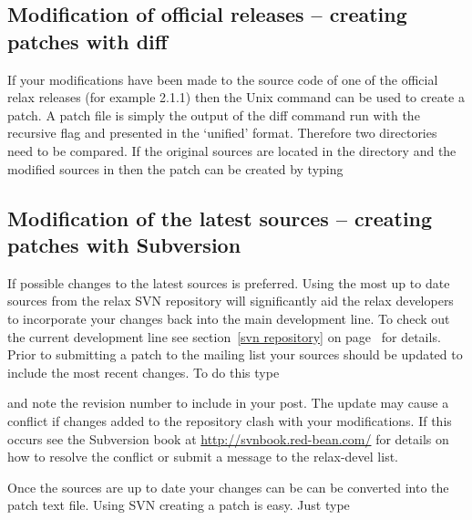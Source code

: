 \subsection{Modification of official releases -- creating patches with diff}

If your modifications have been made to the source code of one of the official relax releases (for example 2.1.1) then the Unix command  can be used to create a patch.
A patch file is simply the output of the diff command run with the recursive flag and presented in the `unified' format.
Therefore two directories need to be compared.
If the original sources are located in the directory  and the modified sources in  then the patch can be created by typing




\subsection{Modification of the latest sources -- creating patches with Subversion}

If possible changes to the latest sources is preferred.
Using the most up to date sources from the relax SVN repository will significantly aid the relax developers to incorporate your changes back into the main development line.
To check out the current development line see section~\ref{svn repository} on page~\pageref{svn repository} for details.
Prior to submitting a patch to the mailing list your sources should be updated to include the most recent changes.
To do this type


and note the revision number to include in your post.
The update may cause a conflict if changes added to the repository clash with your modifications.
If this occurs see the Subversion book at \href{http://svnbook.red-bean.com/}{http://svnbook.red-bean.com/} for details on how to resolve the conflict or submit a message to the rela\mbox{x-d}evel list.

Once the sources are up to date your changes can be can be converted into the patch text file.
Using SVN creating a patch is easy.
Just type

